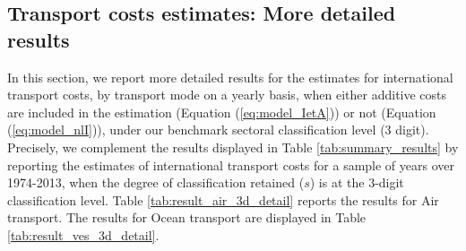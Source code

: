 \documentclass[a4paper,11pt]{article}
\begin{document}
\subsection{Transport costs estimates: More detailed results}

In this section, we report more detailed results for the estimates for international transport costs, by transport mode on a yearly basis, when either additive costs are included in the estimation (Equation (\ref{eq:model_IetA})) or not (Equation (\ref{eq:model_nlI})), under our benchmark sectoral classification level (3 digit). Precisely, we complement the results displayed in Table \ref{tab:summary_results} by reporting the estimates of international transport costs for a sample of years over 1974-2013, when the degree of classification retained ($s$) is at the 3-digit classification level. Table \ref{tab:result_air_3d_detail} reports the results for Air transport. The results for Ocean transport are displayed in Table \ref{tab:result_ves_3d_detail}.
\end{document}
